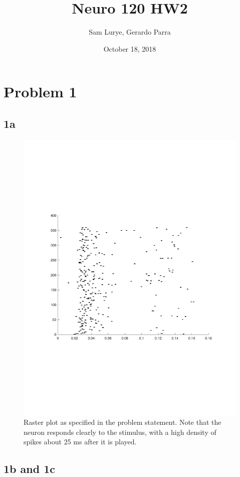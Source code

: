 \documentclass[]{article}
\begin{document}
\title{Neuro 120 HW2}
\author{Sam Lurye, Gerardo Parra}
\date{October 18, 2018}
\maketitle

\section*{Problem 1}
\subsection*{1a}

\begin{figure}[H]
    \centering
    \includegraphics[width=0.6\linewidth]{problem1a.pdf}
    \caption{Raster plot as specified in the problem statement. Note that the neuron responds clearly to the stimulus, with a high density of spikes about 25 ms after it is played.}
    \label{fig:my_label}
\end{figure}

\subsection*{1b and 1c}
\end{document}
